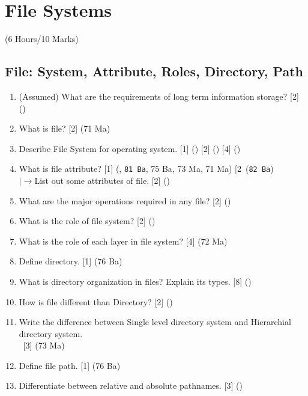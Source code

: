 \documentclass[12pt]{article}
\newcommand{\lb}{\\$\left|\rightarrow\right.$}
\newcommand{\enter}{\\\textcolor{white}{1}}
\begin{document}
	\pagebreak

\section{File Systems}
	\begin{center}(6 Hours/10 Marks)\end{center}
	\subsection{File: System, Attribute, Roles, Directory, Path}
		\begin{enumerate}[noitemsep, topsep=0pt]
			\item (Assumed) What are the requirements of long term information storage? \hfill [2] ()

			\item What is file? \hfill [2] (71 Ma)
			
			\item Describe File System for operating system. \hfill [1] () [2] () [4] ()

			\item What is file attribute? \hfill [1] (, \texttt{81 Ba}, 75 Ba, 73 Ma, 71 Ma) [2\ (\texttt{82 Ba})
			\lb List out some attributes of file. \hfill [2] ()

			\item What are the major operations required in any file? \hfill [2] ()

			\item What is the role of file system? \hfill [2] ()

			\item What is the role of each layer in file system? \hfill [4] (72 Ma)
			
			\item Define directory. \hfill [1] (76 Ba)
			
			\item What is directory organization in files? Explain its types. \hfill [8] ()

			\item How is file different than Directory? \hfill [2] ()\item Write the difference between Single level directory system and Hierarchial directory system.
				\enter\hfill [3] (73 Ma)
			
			\item Define file path. \hfill [1] (76 Ba)

			\item Differentiate between relative and absolute pathnames. \hfill [3] ()
		\end{enumerate}
\end{document}
